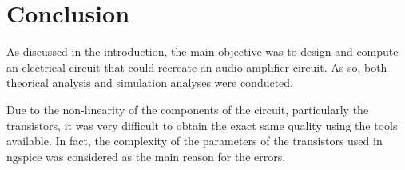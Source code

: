 \newpage
\vspace{4cm}
\section{Conclusion}
\label{con}

\par As discussed in the introduction, the main objective was to design and compute an electrical circuit that could recreate an audio amplifier circuit. As so, both theorical analysis and simulation analyses were conducted. 

\par Due to the non-linearity of the components of the circuit, particularly the transistors, it was very difficult to obtain the exact same quality using the tools available. In fact, the complexity of the parameters of the transistors used in ngspice was considered as the main reason for the errors.
